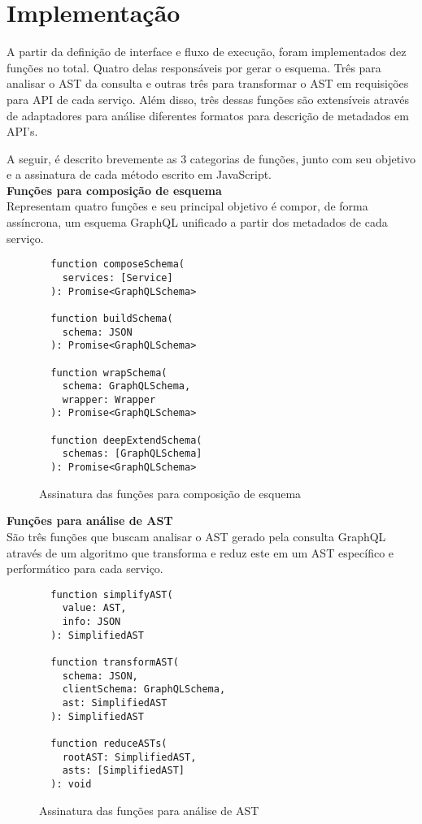 \section{Implementação}

A partir da definição de interface e fluxo de execução, foram implementados dez funções no total. Quatro delas responsáveis por gerar o esquema. Três para analisar o AST da consulta e outras três para transformar o AST em requisições para API de cada serviço. Além disso, três dessas funções são extensíveis através de adaptadores para análise diferentes formatos para descrição de metadados em API's. 

A seguir, é descrito brevemente as 3 categorias de funções, junto com seu objetivo e a assinatura de cada método escrito em JavaScript. \\

\textbf{Funções para composição de esquema} \\

Representam quatro funções e seu principal objetivo é compor, de forma assíncrona, um esquema GraphQL unificado a partir dos metadados de cada serviço.

\begin{figure}[H]
  \centering
  \begin{verbatim}
  function composeSchema(
    services: [Service]
  ): Promise<GraphQLSchema>

  function buildSchema(
    schema: JSON
  ): Promise<GraphQLSchema>

  function wrapSchema(
    schema: GraphQLSchema, 
    wrapper: Wrapper
  ): Promise<GraphQLSchema>

  function deepExtendSchema(
    schemas: [GraphQLSchema]
  ): Promise<GraphQLSchema>
  \end{verbatim}
  \caption{Assinatura das funções para composição de esquema}
\end{figure}

\textbf{Funções para análise de AST} \\

São três funções que buscam analisar o AST gerado pela consulta GraphQL através de um algoritmo que transforma e reduz este em um AST específico e performático para cada serviço.

\begin{figure}[H]
  \centering
  \begin{verbatim}
  function simplifyAST(
    value: AST, 
    info: JSON
  ): SimplifiedAST

  function transformAST(
    schema: JSON,
    clientSchema: GraphQLSchema, 
    ast: SimplifiedAST
  ): SimplifiedAST

  function reduceASTs(
    rootAST: SimplifiedAST, 
    asts: [SimplifiedAST]
  ): void
  \end{verbatim}
  \caption{Assinatura das funções para análise de AST}
\end{figure}

